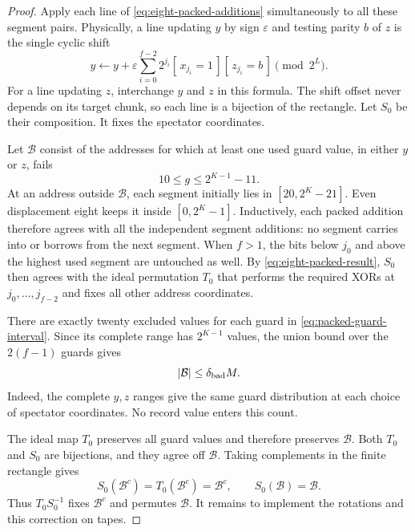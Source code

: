 \begin{proof}
Apply each line of \eqref{eq:eight-packed-additions} simultaneously to all
these segment pairs. Physically, a line updating $y$ by sign $\varepsilon$
and testing parity $b$ of $z$ is the single cyclic shift
\begin{equation}
\label{eq:packed-cyclic-shift}
 y\longleftarrow y+
 \varepsilon\sum_{i=0}^{f-2}2^{j_i}
 [\,x_{j_i}=1\,][\,z_{j_i}=b\,]
 \pmod{2^L}.
\end{equation}
For a line updating $z$, interchange $y$ and $z$ in this formula.
The shift offset never depends on its target chunk, so each line is a
bijection of the rectangle. Let $S_0$ be their composition. It fixes
the spectator coordinates.

Let $\mathcal B$ consist of the addresses for which
at least one used guard value, in either $y$ or $z$, fails
\begin{equation}
\label{eq:packed-guard-interval}
 10\le g\le 2^{K-1}-11.
\end{equation}
At an address outside $\mathcal B$, each segment initially lies in
$[20,2^K-21]$. Even displacement eight keeps it inside
$[0,2^K-1]$. Inductively, each packed addition therefore agrees with all
the independent segment additions: no segment carries into or borrows
from the next segment. When $f>1$, the bits below $j_0$ and above the
highest used segment are untouched as well. By
\eqref{eq:eight-packed-result}, $S_0$
then agrees with the ideal permutation $T_0$ that performs the required
XORs at $j_0,\ldots,j_{f-2}$ and fixes all other address coordinates.

There are exactly twenty excluded values for each guard in
\eqref{eq:packed-guard-interval}. Since its complete range has
$2^{K-1}$ values, the union bound over the $2(f-1)$ guards gives
\begin{equation}
\label{eq:packed-bad-fraction}
 |\mathcal B|\le\delta_{\rm bad}M.
\end{equation}
Indeed, the complete $y,z$ ranges give the same guard distribution at
each choice of spectator coordinates. No record value enters this count.

The ideal map $T_0$ preserves all guard values and therefore preserves
$\mathcal B$. Both $T_0$ and $S_0$ are bijections, and they agree off
$\mathcal B$. Taking complements in the finite rectangle gives
\[
 S_0(\mathcal B^c)=T_0(\mathcal B^c)=\mathcal B^c,
 \qquad S_0(\mathcal B)=\mathcal B.
\]
Thus $T_0S_0^{-1}$ fixes $\mathcal B^c$ and permutes $\mathcal B$.
It remains to implement the rotations and this correction on tapes.


\end{proof}
